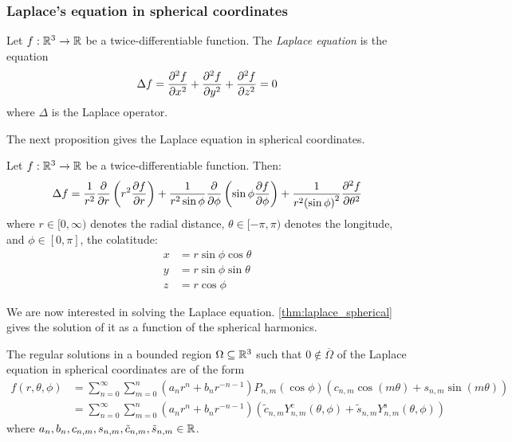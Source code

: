 \documentclass[../main.tex]{subfiles}
\begin{document}
\subsubsection{Laplace's equation in spherical coordinates}\label{sec:laplace_spherical}
\begin{definition}
  Let $f:\mathbb{R}^3\rightarrow\mathbb{R}$ be a twice-differentiable function. The \emph{Laplace equation} is the equation
  \begin{equation}
    \Delta f=\pdv[2]{f}{x}+\pdv[2]{f}{y}+\pdv[2]{f}{z}=0
  \end{equation}
  where $\Delta$ is the Laplace operator.
\end{definition}
The next proposition gives the Laplace equation in spherical coordinates.
\begin{proposition}
  Let $f:\mathbb{R}^3\rightarrow\mathbb{R}$ be a twice-differentiable function. Then:
  \begin{equation}\label{eq:laplace}
    \Delta f = \frac{1}{r^2}\pdv{}{r}\left(r^2\pdv{f}{r}\right)+\frac{1}{r^2\sin\phi}\pdv{}{\phi}\left(\sin\phi\pdv{f}{\phi}\right)+\frac{1}{r^2{(\sin\phi)}^2}\pdv[2]{f}{\theta}
  \end{equation}
  where $r\in[0,\infty)$ denotes the radial distance, $\theta\in[-\pi,\pi)$ denotes the longitude, and $\phi\in[0,\pi]$, the colatitude:
  \begin{equation}
    \begin{aligned}
      x & =r\sin\phi\cos\theta \\
      y & =r\sin\phi\sin\theta \\
      z & =r\cos\phi
    \end{aligned}
  \end{equation}
\end{proposition}
We are now interested in solving the Laplace equation. \cref{thm:laplace_spherical} gives the solution of it as a function of the spherical harmonics.
\begin{theorem}\label{thm:laplace_spherical}
  The regular solutions in a bounded region $\Omega\subseteq \mathbb{R}^3$ such that $0\notin\overline{\Omega}$ of the Laplace equation in spherical coordinates are of the form
  \begin{align}
    f(r,\theta,\phi) & = \sum_{n=0}^\infty \sum_{m=0}^n (a_n r^{n} +b_{n}r^{-n-1})P_{n,m}(\cos\phi) (c_{n,m}\cos(m\theta)+s_{n,m}\sin(m\theta))                                                              \\
                     & \label{eq:sol_laplace} = \sum_{n=0}^\infty \sum_{m=0}^n (a_n r^{n} +b_{n}r^{-n-1})(\tilde{c}_{n,m}Y_{n,m}^{\mathrm{c}}(\theta,\phi)+\tilde{s}_{n,m}Y_{n,m}^{\mathrm{s}}(\theta,\phi))
  \end{align}
  where $a_n,b_n,c_{n,m},s_{n,m},\tilde{c}_{n,m},\tilde{s}_{n,m}\in\mathbb{R}$.
\end{theorem}
\end{document}

